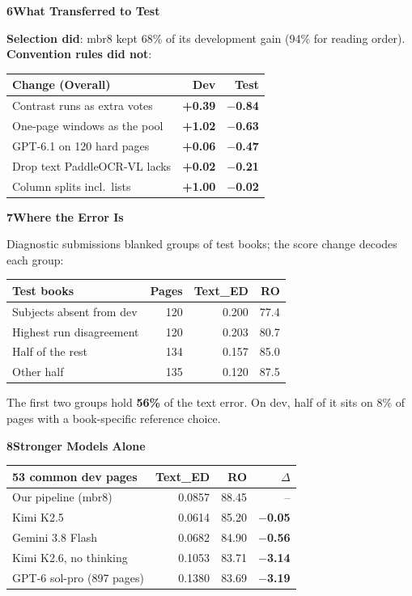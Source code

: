 \documentclass{article}
\newcommand{\tsmall}{\fontsize{24}{29}\selectfont}
\newcommand{\up}[1]{\textcolor{green!45!black}{\textbf{#1}}}
\newcommand{\dn}[1]{\textcolor{red!65!black}{\textbf{#1}}}
\newcommand{\ted}{Text\_ED}
\newcommand{\blk}[2]{%
  \par\vspace{8mm}%
  {\fontsize{44}{50}\selectfont\bfseries\textcolor{accent}{#1\hspace{6mm}#2}}\par
  \vspace{-2mm}{\color{accent}\rule{\linewidth}{1mm}}\par\vspace{0mm}}
\begin{document}
\begin{minipage}[t]{245mm}
\blk{6}{What Transferred to Test}
\textbf{Selection did}: mbr8 kept 68\% of its development gain (94\% for reading order). \textbf{Convention rules did not}:

{\tsmall
\begin{tabularx}{\linewidth}{@{}Xrr@{}}
\toprule
Change (Overall) & Dev & Test \\
\midrule
Contrast runs as extra votes & \up{+0.39} & \dn{$-$0.84} \\
One-page windows as the pool & \up{+1.02} & \dn{$-$0.63} \\
GPT-6.1 on 120 hard pages & \up{+0.06} & \dn{$-$0.47} \\
Drop text PaddleOCR-VL lacks & \up{+0.02} & \dn{$-$0.21} \\
Column splits incl.\ lists & \up{+1.00} & \dn{$-$0.02} \\
\bottomrule
\end{tabularx}\par}\vspace{3mm}

\blk{7}{Where the Error Is}
Diagnostic submissions blanked groups of test books; the score change decodes each group:

{\tsmall
\begin{tabularx}{\linewidth}{@{}Xrrr@{}}
\toprule
Test books & Pages & \ted & RO \\
\midrule
Subjects absent from dev & 120 & 0.200 & 77.4 \\
Highest run disagreement & 120 & 0.203 & 80.7 \\
Half of the rest & 134 & 0.157 & 85.0 \\
Other half & 135 & 0.120 & 87.5 \\
\bottomrule
\end{tabularx}\par}\vspace{3mm}

The first two groups hold \textbf{56\%} of the text error. On dev, half of it sits on 8\% of pages with a book-specific reference choice.

\blk{8}{Stronger Models Alone}
{\tsmall
\begin{tabularx}{\linewidth}{@{}Xrrr@{}}
\toprule
53 common dev pages & \ted & RO & $\Delta$ \\
\midrule
Our pipeline (mbr8) & 0.0857 & 88.45 & -- \\
Kimi K2.5 & 0.0614 & 85.20 & \dn{$-$0.05} \\
Gemini 3.8 Flash & 0.0682 & 84.90 & \dn{$-$0.56} \\
Kimi K2.6, no thinking & 0.1053 & 83.71 & \dn{$-$3.14} \\
GPT-6 sol-pro (897 pages) & 0.1380 & 83.69 & \dn{$-$3.19} \\
\bottomrule
\end{tabularx}\par}\vspace{3mm}


\end{minipage}
\end{document}
